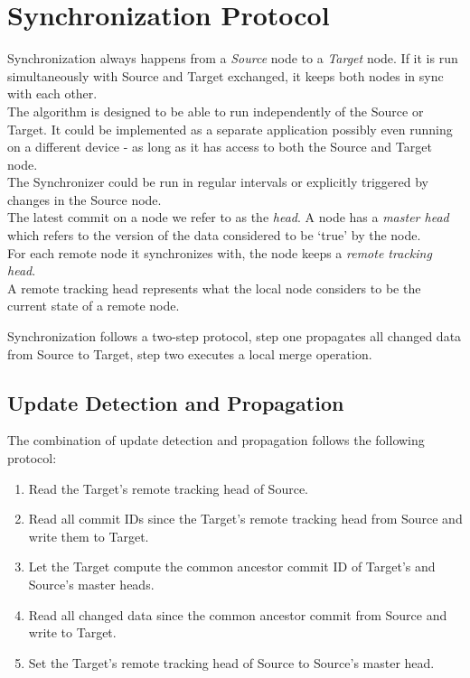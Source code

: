 
\section{Synchronization Protocol}
\label{sec:histo.protocol}
Synchronization always happens from a \emph{Source} node to a \emph{Target} node.
If it is run simultaneously with Source and Target exchanged, it keeps both nodes in sync with each other.\\
The algorithm is designed to be able to run independently of the Source or Target.
It could be implemented as a separate application possibly even running on a different device - as long as it has access to both the Source and Target node.\\
The Synchronizer could be run in regular intervals or explicitly triggered by changes in the Source node.\\

The latest commit on a node we refer to as the \emph{head}.
A node has a \emph{master head} which refers to the version of the data considered to be `true' by the node.\\
For each remote node it synchronizes with, the node keeps a \emph{remote tracking head}.\\
A remote tracking head represents what the local node considers to be the current state of a remote node.

Synchronization follows a two-step protocol, step one propagates all changed data from Source to Target, step two executes a local merge operation.

\subsection{Update Detection and Propagation}
\label{sec:histo.protocol.detection-propagation}
The combination of update detection and propagation follows the following protocol:

\begin{enumerate}
\item Read the Target's remote tracking head of Source.
\item Read all commit IDs since the Target's remote tracking head from Source and write them to Target.
\item Let the Target compute the common ancestor commit ID of Target's and Source's master heads.
\item Read all changed data since the common ancestor commit from Source and write to Target.
\item Set the Target's remote tracking head of Source to Source's master head.
\end{enumerate}

